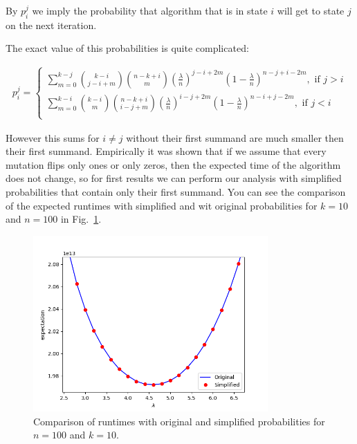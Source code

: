 \documentclass{article}
\begin{document}
By $p_i^j$ we imply the probability that algorithm that is in state $i$ will get to state $j$ on the next iteration.

The exact value of this probabilities is quite complicated:

\begin{align*}
  p_i^j = \begin{cases}
    \sum_{m = 0}^{k - j} \binom{k - i}{j - i + m} \binom{n - k + i}{m} \left(\frac{\lambda}{n}\right)^{j - i + 2m} \left(1 - \frac{\lambda}{n}\right)^{n - j + i - 2m}, \text{ if } j > i \\
      \sum_{m = 0}^{k - i} \binom{k - i}{m} \binom{n - k + i}{i - j + m} \left(\frac{\lambda}{n}\right)^{i - j + 2m} \left(1 - \frac{\lambda}{n}\right)^{n - i + j - 2m}, \text{ if } j < i \\
  \end{cases}
\end{align*}

However this sums for $i \ne j$ without their first summand are much smaller then their first summand. Empirically it was shown that if we assume that every mutation flips only ones or only zeros, then the expected time of the algorithm does not change, so for first results we can perform our analysis with simplified probabilities that contain only their first summand. You can see the comparison of the expected runtimes with simplified and wit original probabilities for $k = 10$ and $n = 100$ in Fig.~\ref{plot_simpl}.

\begin{figure}[t]
 \includegraphics[width=0.8\textwidth]{pic/simplified_probs.png}
 \caption{Comparison of runtimes with original and simplified probabilities for $n = 100$ and $k = 10$.
 \label{plot_simpl}}
\end{figure}
\end{document}
